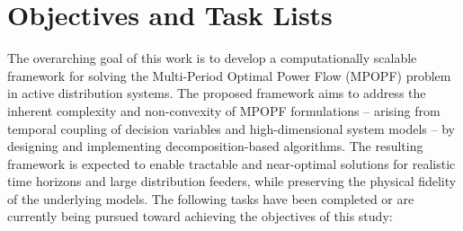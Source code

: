\clearpage
\section{Objectives and Task Lists}
The overarching goal of this work is to develop a computationally scalable framework for solving the Multi-Period Optimal Power Flow (MPOPF) problem in active distribution systems. The proposed framework aims to address the inherent complexity and non-convexity of MPOPF formulations -- arising from temporal coupling of decision variables and high-dimensional system models -- by designing and implementing decomposition-based algorithms. The resulting framework is expected to enable tractable and near-optimal solutions for realistic time horizons and large distribution feeders, while preserving the physical fidelity of the underlying models. The following tasks have been completed or are currently being pursued toward achieving the objectives of this study:

